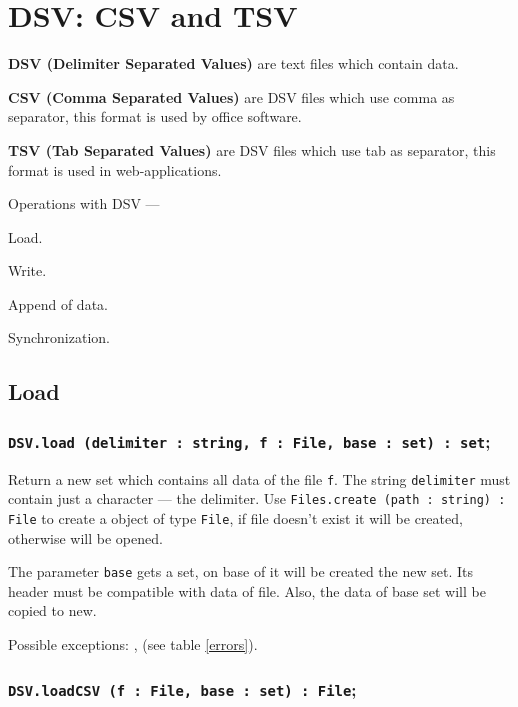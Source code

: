 \section{DSV: CSV and TSV}

{\bf DSV (Delimiter Separated Values)} are text files which contain data.

{\bf CSV (Comma Separated Values)} are DSV files which use comma as separator, this format is used by office software.

{\bf TSV (Tab Separated Values)} are DSV files which use tab as separator, this format is used in web-applications.

Operations with DSV —
\begin{icItems}
	\item Load.
	\item Write.
	\item Append of data.
	\item Synchronization.
\end{icItems}

\subsection{Load}

\subsubsection{\texttt{DSV.load (delimiter : string, f : File, base : set) : set};}

Return a new set which contains all data of the file \texttt{f}. The string \texttt{delimiter} must contain just a character — the delimiter. Use \texttt{Files.create (path : string) : File} to create a object of type \texttt{File}, if file doesn't exist it will be created, otherwise will be opened.

The parameter \texttt{base} gets a set, on base of it will be created the new set. Its header must be compatible with data of file. Also, the data of base set will be copied to new.

Possible exceptions: ,  (see table \ref{errors}).

\subsubsection{\texttt{DSV.loadCSV (f : File, base : set) : File};}

